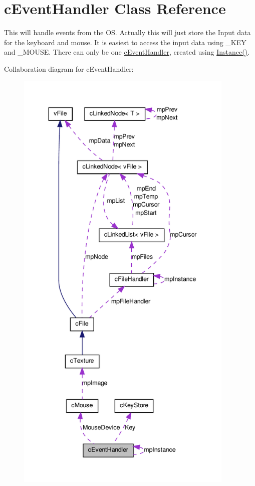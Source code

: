 \hypertarget{classc_event_handler}{
\section{cEventHandler Class Reference}
\label{classc_event_handler}
}


This will handle events from the OS. Actually this will just store the Input data for the keyboard and mouse. It is easiest to access the input data using \_\-KEY and \_\-MOUSE. There can only be one \hyperlink{classc_event_handler}{cEventHandler}, created using \hyperlink{classc_event_handler_a8cf5519e1f3c5f6a6f79f9da75fb2750}{Instance()}.  




Collaboration diagram for cEventHandler:\nopagebreak
\begin{figure}[H]
\begin{center}
\leavevmode
\includegraphics[height=600pt]{classc_event_handler__coll__graph}
\end{center}
\end{figure}
